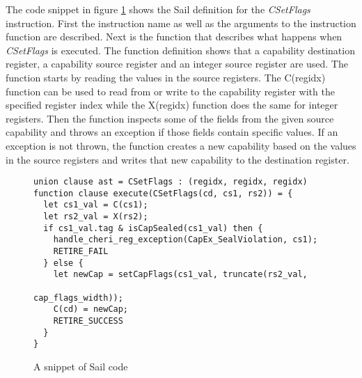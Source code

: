 The code snippet in figure \ref{fig:sailcode} shows the Sail definition for the \textit{CSetFlags} instruction.
First the instruction name as well as the arguments to the instruction function are described.
Next is the function that describes what happens when \textit{CSetFlags} is executed.
The function definition shows that a capability destination register, a capability source register and an integer source register are used.
The function starts by reading the values in the source registers.
The C(regidx) function can be used to read from or write to the capability register with the specified register index while the X(regidx) function does the same for integer registers.
Then the function inspects some of the fields from the given source capability and throws an exception if those fields contain specific values.
If an exception is not thrown, the function creates a new capability based on the values in the source registers and writes that new capability to the destination register.

\begin{figure}[h]
\begin{verbatim}
union clause ast = CSetFlags : (regidx, regidx, regidx)
function clause execute(CSetFlags(cd, cs1, rs2)) = {
  let cs1_val = C(cs1);
  let rs2_val = X(rs2);
  if cs1_val.tag & isCapSealed(cs1_val) then {
    handle_cheri_reg_exception(CapEx_SealViolation, cs1);
    RETIRE_FAIL
  } else {
    let newCap = setCapFlags(cs1_val, truncate(rs2_val,
                                               cap_flags_width));
    C(cd) = newCap;
    RETIRE_SUCCESS
  }
}
\end{verbatim}
\caption{A snippet of Sail code}
\label{fig:sailcode}
\end{figure}

